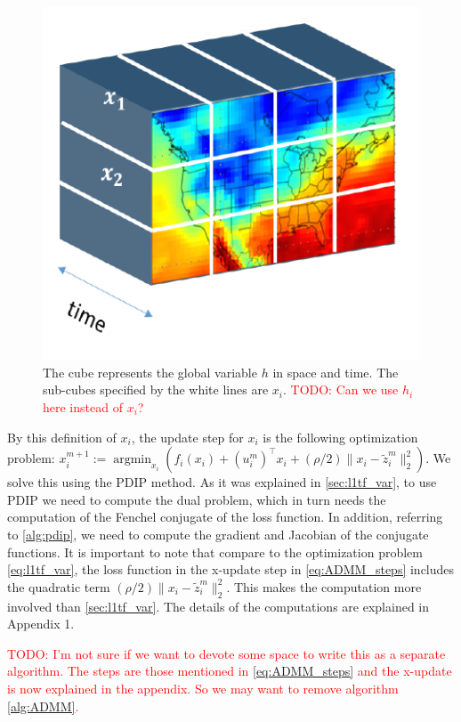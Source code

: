 \documentclass{article}
\DeclareMathOperator*{\argmin}{argmin}
\newcommand{\attn}[1]{\textcolor{red}{TODO: #1}}
\begin{document}
\begin{figure}[tb]
  \centering
  \includegraphics[height=.2\textheight]{Figures/data_cube}
    \caption{The cube represents the global variable $h$ in space and
      time. The sub-cubes specified by the white lines are
      $x_i$. \attn{Can we use $h_i$ here instead of $x_i$?}}
    \label{fig:data_cube}
\end{figure} 


By this definition of $x_i$, the update step for $x_i$ is the
following optimization problem: $x_i^{m+1}:=\argmin_{x_i} ( f_i(x_i) +
(u_i^m)^\top x_i + (\rho/2) \lVert x_i-\tilde{z}_i^m \lVert_2^2)$. We solve this using the PDIP method. As it was explained in \autoref{sec:l1tf_var}, to use PDIP we need to compute the dual problem, which in turn needs the computation of the Fenchel conjugate of the loss function. In addition, referring to \autoref{alg:pdip}, we need to compute the gradient and Jacobian of the conjugate functions. It is important to note that compare to the optimization problem \autoref{eq:l1tf_var}, the loss function in the x-update step in \autoref{eq:ADMM_steps} includes the quadratic term $(\rho/2) \lVert x_i-\tilde{z}_i^m \lVert_2^2$. This makes the computation more involved than \autoref{sec:l1tf_var}. The details of the computations are explained in Appendix 1.

\attn{I'm not sure if we want to devote some space to write this as a separate algorithm. The steps are those mentioned in \ref{eq:ADMM_steps} and the x-update is now explained in the appendix. So we may want to remove algorithm \ref{alg:ADMM}.}
\end{document}
